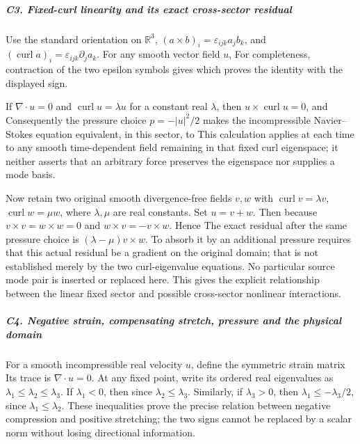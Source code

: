 \subparagraph{C3. Fixed-curl linearity and its exact cross-sector
residual}\label{c3.-fixed-curl-linearity-and-its-exact-cross-sector-residual}

Use the standard orientation on \(\mathbb R^3\),
\((a\times b)_i=\varepsilon_{ijk}a_jb_k\), and
\((\operatorname{curl}a)_i=\varepsilon_{ijk}\partial_ja_k\). For any
smooth vector field \(u\),  For completeness, contraction of the two epsilon symbols gives
 which proves the identity with the displayed sign.

If \(\nabla\cdot u=0\) and \(\operatorname{curl}u=\lambda u\) for a
constant real \(\lambda\), then \(u\times\operatorname{curl}u=0\), and
 Consequently the pressure choice \(p=-|u|^2/2\) makes the
incompressible Navier--Stokes equation equivalent, in this sector, to
 This calculation applies at each time to any smooth time-dependent
field remaining in that fixed curl eigenspace; it neither asserts that
an arbitrary force preserves the eigenspace nor supplies a mode basis.

Now retain two original smooth divergence-free fields \(v,w\) with
\(\operatorname{curl}v=\lambda v\), \(\operatorname{curl}w=\mu w\),
where \(\lambda,\mu\) are real constants. Set \(u=v+w\). Then
 because \(v\times v=w\times w=0\) and \(w\times v=-v\times w\). Hence
 The exact residual after the same pressure choice is
\((\lambda-\mu)v\times w\). To absorb it by an additional pressure
requires that this actual residual be a gradient on the original domain;
that is not established merely by the two curl-eigenvalue equations. No
particular source mode pair is inserted or replaced here. This gives the
explicit relationship between the linear fixed sector and possible
cross-sector nonlinear interactions.

\subparagraph{C4. Negative strain, compensating stretch, pressure and
the physical
domain}\label{c4.-negative-strain-compensating-stretch-pressure-and-the-physical-domain}

For a smooth incompressible real velocity \(u\), define the symmetric
strain matrix  Its trace is \(\nabla\cdot u=0\). At any fixed point, write its
ordered real eigenvalues as \(\lambda_1\le\lambda_2\le\lambda_3\). If
\(\lambda_1<0\), then  since \(\lambda_2\le\lambda_3\). Similarly, if \(\lambda_3>0\), then
\(\lambda_1\le-\lambda_3/2\), since \(\lambda_1\le\lambda_2\). These
inequalities prove the precise relation between negative compression and
positive stretching; the two signs cannot be replaced by a scalar norm
without losing directional information.

